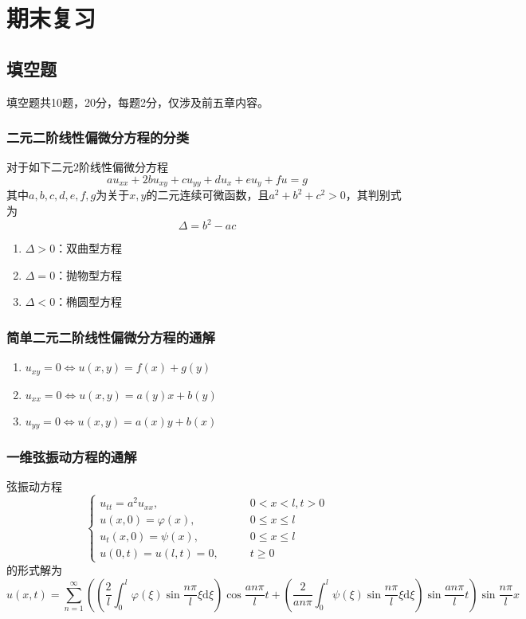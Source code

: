 \documentclass[lang = cn, scheme = chinese, thmcnt = section]{elegantbook}
\newcommand{\dd}{\mathrm{d}}           %
\begin{document}
\appendix

\chapter{期末复习}

\section{填空题}

填空题共10题，20分，每题2分，仅涉及前五章内容。

\subsection{二元二阶线性偏微分方程的分类}

\begin{note}
	对于如下二元$2$阶线性偏微分方程
	$$
	au_{xx}+2bu_{xy}+cu_{yy}+du_x+eu_y+fu=g
	$$
	其中$a,b,c,d,e,f,g$为关于$x,y$的二元连续可微函数，且$a^2+b^2+c^2>0$，其判别式为%
	$$
	\Delta=b^2-ac
	$$
	\begin{enumerate}
		\item $\Delta>0$：双曲型方程
		\item $\Delta=0$：抛物型方程
		\item $\Delta<0$：椭圆型方程
	\end{enumerate}
\end{note}

\subsection{简单二元二阶线性偏微分方程的通解}

\begin{note}
	\begin{enumerate}
		\item $u_{xy}=0 \iff u(x,y)=f(x)+g(y)$
		\item $u_{xx}=0 \iff u(x,y)=a(y)x+b(y)$
		\item $u_{yy}=0 \iff u(x,y)=a(x)y+b(x)$
	\end{enumerate}
\end{note}

\subsection{一维弦振动方程的通解}

\begin{note}
	弦振动方程
	$$
	\begin{cases}
		u_{tt}=a^2u_{xx},\qquad & 0<x<l,t>0\\
		u(x,0)=\varphi(x),\qquad & 0\le x\le l\\
		u_t(x,0)=\psi(x),\qquad & 0\le x\le l\\
		u(0,t)=u(l,t)=0,\qquad & t\ge 0
	\end{cases}
	$$
	的形式解为
	$$
	u(x,t)=\sum_{n=1}^{\infty}\left(\left(\frac{2}{l}\int_0^l\varphi(\xi)\sin\frac{n\pi }{l}\xi\dd \xi\right)\cos\frac{an\pi}{l}t+\left(\frac{2}{an\pi}\int_0^l\psi(\xi)\sin\frac{n\pi }{l}\xi\dd \xi\right)\sin \frac{an\pi}{l}t\right)\sin\frac{n\pi}{l}x
	$$
\end{note}
\end{document}
